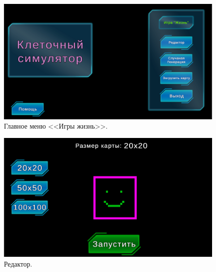 \documentclass[14pt, oneside]{altsu-report}
\begin{document}
\begin{code}
	\vspace{-1cm}\inputminted[mathescape,linenos,frame=lines,fontsize=\tiny,breaklines]{csharp}{src/RandomButton.cs}
\end{code}

\begin{code}
	\vspace{-1cm}\inputminted[mathescape,linenos,frame=lines,fontsize=\tiny,breaklines]{csharp}{src/LevelTransition.cs}
\end{code}

\begin{figure}[H]
	\centering
	\includegraphics[width=1\textwidth]{images/MainMenu.png}  
	\caption{Главное меню <<Игры жизнь>>.}
	\label{MainM}
\end{figure}

\begin{figure}[H]
	\centering
	\includegraphics[width=1\textwidth]{images/Editor.png}  
	\caption{Редактор.}
	\label{Editor}
\end{figure}
\end{document}
